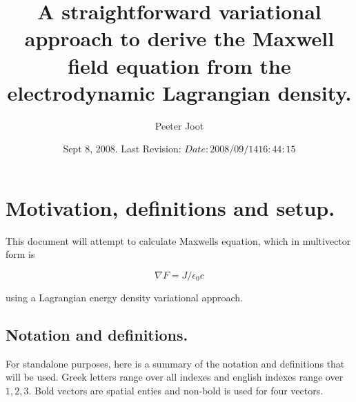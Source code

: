 \documentclass{article}
\title{ A straightforward variational approach to derive the Maxwell field equation from the electrodynamic Lagrangian density. }
\author{Peeter Joot}
\date{ Sept 8, 2008.  Last Revision: $Date: 2008/09/14 16:44:15 $ }
\newcommand{\grad}[0]{\nabla}
\begin{document}
\tableofcontents

\maketitle{}

\section{ Motivation, definitions and setup. }

This document will attempt to calculate Maxwells equation, which in multivector form is

\begin{equation}\label{eqn:maxwell}
\grad F = J/\epsilon_0 c
\end{equation}

using a Lagrangian energy density variational approach.

\subsection{ Notation and definitions. }

For standalone purposes, here is a summary of the notation and definitions that will be used.  Greek letters range over all indexes and
english indexes range over $1,2,3$.  Bold vectors are spatial enties and non-bold is used for four vectors.
\end{document}
